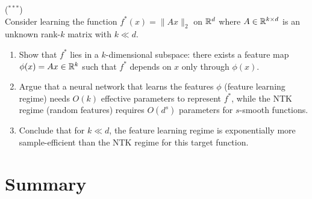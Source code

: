 \documentclass[11pt,a4paper]{article}
\begin{document}
\begin{exercise}
\textnormal{(\({}^{***}\))} \\
Consider learning the function $f^*(x) = \|Ax\|_2$ on $\mathbb{R}^d$ where
$A \in \mathbb{R}^{k \times d}$ is an unknown rank-$k$ matrix with $k \ll d$.
\begin{enumerate}[label=(\alph*)]
  \item Show that $f^*$ lies in a $k$-dimensional subspace: there
    exists a feature map $\phi(x) = Ax \in \mathbb{R}^k$ such that $f^*$
    depends on $x$ only through $\phi(x)$.
  \item Argue that a neural network that learns the features $\phi$
    (feature learning regime) needs $O(k)$ effective parameters to
    represent $f^*$, while the NTK regime (random features)
    requires $O(d^s)$ parameters for $s$-smooth functions.
  \item Conclude that for $k \ll d$, the feature learning regime
    is exponentially more sample-efficient than the NTK regime for
    this target function.
\end{enumerate}
\end{exercise}

\section{Summary}
\label{sec:summary}
\end{document}
